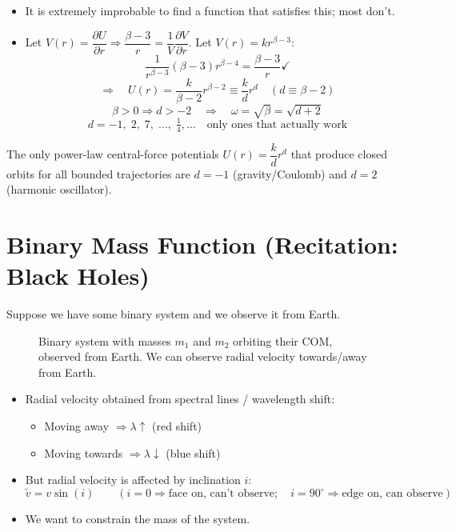 \begin{itemize}
    \item It is extremely improbable to find a function that satisfies this; most don't.
    \item Let $V(r) = \dfrac{\partial U}{\partial r} \Rightarrow \dfrac{\beta - 3}{r} = \dfrac{1}{V}\dfrac{\partial V}{\partial r}$.
    Let $V(r) = kr^{\beta-3}$:
    \[
        \frac{1}{r^{\beta-3}}(\beta-3)r^{\beta-4} = \frac{\beta-3}{r} \checkmark
    \]
    \[
        \Rightarrow\quad
        \boxed{U(r) = \frac{k}{\beta-2}r^{\beta-2} \equiv \frac{k}{d}r^d}
        \quad (d \equiv \beta - 2)
    \]
    \[
        \beta > 0 \Rightarrow d > -2
        \quad\Rightarrow\quad \omega = \sqrt{\beta} = \sqrt{d+2}
    \]
    \[
        \boxed{d = -1,\;2,\;7,\;\ldots,\;\tfrac{1}{4}, \ldots \quad \text{only ones that actually work}}
    \]
\end{itemize}

\begin{theorem}
The only power-law central-force potentials $U(r) = \dfrac{k}{d}r^d$ that produce closed orbits for all bounded trajectories are $d = -1$ (gravity/Coulomb) and $d = 2$ (harmonic oscillator).
\end{theorem}


\section{Binary Mass Function (Recitation: Black Holes)}

Suppose we have some binary system and we observe it from Earth.

\begin{figure}[H]
\centering
\caption{Binary system with masses $m_1$ and $m_2$ orbiting their COM, observed from Earth. We can observe radial velocity towards/away from Earth.}
\end{figure}

\begin{itemize}
    \item Radial velocity obtained from spectral lines / wavelength shift:
    \begin{itemize}
        \item Moving away $\Rightarrow \lambda\uparrow$ (red shift)
        \item Moving towards $\Rightarrow \lambda\downarrow$ (blue shift)
    \end{itemize}
    \item But radial velocity is affected by inclination $i$:
    \[
        \tilde{v} = v\sin(i)
        \qquad (i=0 \Rightarrow\text{face on, can't observe}; \quad i=90^\circ \Rightarrow \text{edge on, can observe})
    \]
    \item We want to constrain the mass of the system.
\end{itemize}

